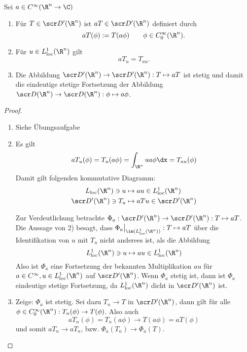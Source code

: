 \begin{st} \label{5.18}
	Sei $a \in C^\infty (\R^n \to \C)$
	\begin{enumerate}[1)]
		\item
			Für $T \in \scr D'(\R^n)$ ist $a T \in \scr D'(\R^n)$ definiert durch
			\[
				a T (\phi) := T(a \phi)
				\qquad \phi \in C_0^\infty (\R^n).
			\]
		\item
			Für $u \in L_{\text{loc}}^1 (\R^n)$ gilt
			\[
				a T_u = T_{au}.
			\]
		\item
			Die Abbildung $\scr D'(\R^n) \to \scr D'(\R^n) : T \mapsto a T$ ist stetig und damit die eindeutige stetige Fortsetzung der Abbildung $\scr D(\R^n) \to \scr D(\R^n) : \phi \mapsto a \phi$.
	\end{enumerate}
	\begin{proof}
		\begin{enumerate}[1)]
			\item
				Siehe Übungsaufgabe
			\item
				Es gilt
				\begin{align*}
					a T_u (\phi)
					= T_u (a \phi)
					= \int_{\R^n} u a \phi \dx
					= T_{au} (\phi)
				\end{align*}
				Damit gilt folgenden kommutative Diagramm:
				\begin{align*}
					L_{\text{loc}}(\R^n) \ni u &\mapsto a u \in L_{\text{loc}}^1(\R^n) \\
					\scr D'(\R^n) \ni T_u &\mapsto a T u \in \scr D'(\R^n)
				\end{align*}

				Zur Verdeutlichung betrachte $\Phi_a : \scr D'(\R^n) \to \scr D'(\R^n) : T \mapsto a T$.
				Die Aussage von 2) besagt, dass $\Phi_a \big|_{\im(L_\text{loc}^1(\R^n))} : T \mapsto a T$ über die Identifikation von $u$ mit $T_u$ nicht anderees ist, als die Abbildung
				\[
					L_{\text{loc}}^1 (\R^n) \ni u \mapsto a u \in L_{\text{loc}}^1(\R^n)
				\]
				Also ist $\Phi_a$ eine Fortsetzung der bekannten Multiplikation $a u$ für $a \in C^\infty, u \in L_{\text{loc}}^1(\R^n)$ auf $\scr D'(\R^n)$.
				Wenn $\Phi_a$ stetig ist, dann ist $\Phi_a$ eindeutige stetige Fortsetzung, da $L_{\text{loc}}^1(\R^n)$ dicht in $\scr D'(\R^n)$ ist.
			\item
				Zeige: $\Phi_a$ ist stetig.
				Sei dazu $T_n \to T$ in $\scr D'(\R^n)$, dann gilt für alle $\phi \in C_0^\infty(\R^n) : T_n(\phi) \to T(\phi)$.
				Also auch 
				\[
					a T_n(\phi) = T_n(a\phi) \to T(a\phi) = a T(\phi)
				\]
				und somit $a T_n \to a T_n$, bzw. $\Phi_a (T_n) \to \Phi_a (T)$.
		\end{enumerate}
	\end{proof}
\end{st}

